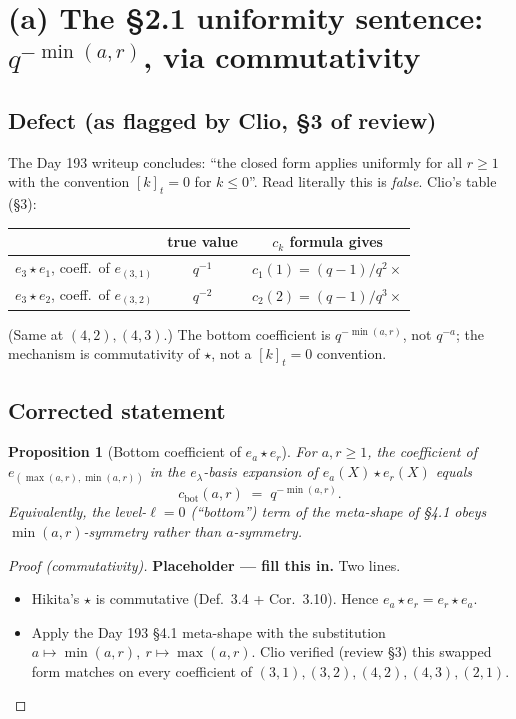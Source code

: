 \documentclass[11pt]{article}
\newtheorem{proposition}[theorem]{Proposition}
\theoremstyle{definition}
\newcommand{\qi}[1]{[#1]_t}
\begin{document}
\section{(a) The \S2.1 uniformity sentence: $q^{-\min(a,r)}$, via commutativity}
\label{sec:min-fix}

\subsection*{Defect (as flagged by Clio, \S3 of review)}
The Day 193 writeup concludes: ``the closed form applies uniformly for
all $r\ge 1$ with the convention $\qi k = 0$ for $k\le 0$''. Read
literally this is \emph{false}. Clio's table (\S3):
\begin{center}
\begin{tabular}{lcc}
& true value & $c_k$ formula gives \\ \hline
$e_3\star e_1$, coeff.\ of $e_{(3,1)}$ & $q^{-1}$ & $c_1(1)=(q-1)/q^2\times$ \\
$e_3\star e_2$, coeff.\ of $e_{(3,2)}$ & $q^{-2}$ & $c_2(2)=(q-1)/q^3\times$ \\
\end{tabular}
\end{center}
(Same at $(4,2),(4,3)$.) The bottom coefficient is
$q^{-\min(a,r)}$, not $q^{-a}$; the mechanism is commutativity of
$\star$, not a $\qi k=0$ convention.

\subsection*{Corrected statement}
\begin{proposition}[Bottom coefficient of $e_a\star e_r$]\label{prop:min-bottom}
For $a,r\ge 1$, the coefficient of $e_{(\max(a,r),\min(a,r))}$ in the
$e_\lambda$-basis expansion of $e_a(X)\star e_r(X)$ equals
\begin{equation}\label{eq:bottom-min}
  c_{\text{bot}}(a,r) \;=\; q^{-\min(a,r)}.
\end{equation}
Equivalently, the level-$\ell=0$ (``bottom'') term of the meta-shape
of \S4.1 obeys $\min(a,r)$-symmetry rather than $a$-symmetry.
\end{proposition}

\begin{proof}[Proof (commutativity)]
\textbf{Placeholder --- fill this in.} Two lines.
\begin{itemize}[leftmargin=1.5em]
  \item Hikita's $\star$ is commutative (Def.\ 3.4 + Cor.\ 3.10).
        Hence $e_a\star e_r = e_r\star e_a$.
  \item Apply the Day 193 \S4.1 meta-shape with the substitution
        $a\mapsto\min(a,r),\ r\mapsto\max(a,r)$. Clio verified
        (review \S3) this swapped form matches on every coefficient
        of $(3,1),(3,2),(4,2),(4,3),(2,1)$.\qedhere
\end{itemize}
\end{proof}
\end{document}
